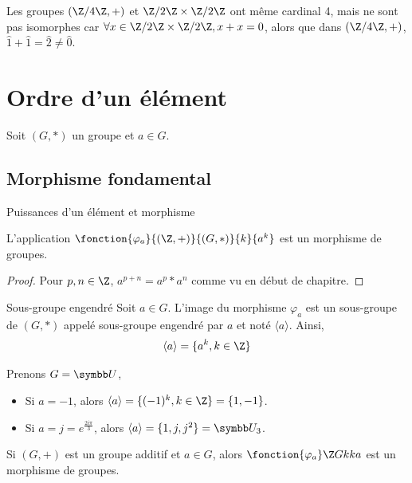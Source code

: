 \begin{exemple}
    Les groupes $(\Z/4\Z, +)$ et $\Z / 2\Z \times \Z / 2\Z$ ont même cardinal 4,
    mais ne sont pas isomorphes car $\forall x \in \Z / 2\Z \times \Z / 2\Z, x + x = 0$,
    alors que dans $(\Z/4\Z, +)$, $\hat 1 + \hat 1 = \hat 2 \neq \hat 0$.
\end{exemple}

\section{Ordre d'un élément}

Soit $(G, \ast)$ un groupe et $a \in G$.

\subsection{Morphisme fondamental}

\begin{theoreme}{Puissances d'un élément et morphisme}{}

    L'application $\fonction{\varphi_a}{(\Z, +)}{(G, \ast)}{k}{a^k}$ est un morphisme de groupes.
\end{theoreme}

\begin{proof}
    Pour $p, n \in \Z$, $a^{p + n} = a^p \ast a^n$ comme vu en début de chapitre. 
\end{proof}

\begin{definition}{Sous-groupe engendré}{}
    Soit $a \in G$. 
    L'image du morphisme $\varphi_a$ est un sous-groupe de $(G, \ast)$ appelé
    sous-groupe engendré par $a$ et noté $\langle a \rangle$. 
    Ainsi, 
    \[\langle a \rangle = \{a^k, k \in \Z\}\]
\end{definition}

\begin{exemple}
    Prenons $G = \symbb U$,
    \begin{itemize}
        \item Si $a = -1$, alors $\langle a \rangle = \{(-1)^k, k \in \Z\} = \{1, -1\}$.
        \item Si $\displaystyle a = j = e^{\frac{2i\pi}3}$, alors $\langle a \rangle = \{1, j, j^2\} = \symbb U_3$.
    \end{itemize}
\end{exemple}

\begin{remarque}
    Si $(G, +)$ est un groupe additif et $a \in G$, alors 
    $\fonction {\varphi_a} \Z G k {ka}$ est un morphisme de groupes. 
\end{remarque}

